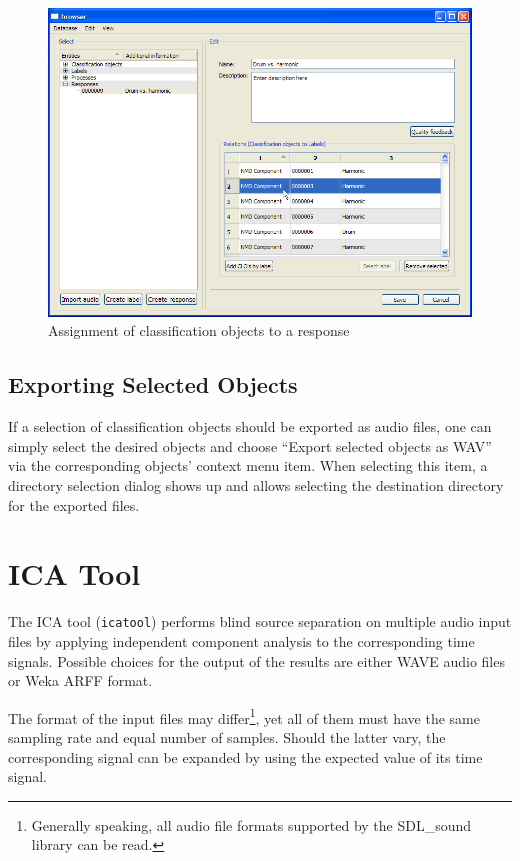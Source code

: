 \begin{figure}
    \includegraphics[width=\textwidth]{images/COAssignment.png}
    \caption{%
        \label{figure:COAssignment}%
        Assignment of classification objects to a response
    }
\end{figure}


\subsection{Exporting Selected Objects}

If a selection of classification objects should be exported as audio files, one
can simply select the desired objects and choose ``Export selected objects as WAV''
via the corresponding objects' context menu item. When selecting this item, a
directory selection dialog shows up and allows selecting the destination
directory for the exported files.


\section{ICA Tool}

The ICA tool (\verb!icatool!) performs blind source separation on multiple audio
input files by applying independent component analysis to the corresponding time
signals. Possible choices for the output of the results are either WAVE audio
files or Weka ARFF format.

The format of the input files may differ\footnote{Generally speaking, all audio
  file formats supported by the SDL\_sound library can be read.}, yet all of them
must have the same sampling rate and equal number of samples. Should the latter
vary, the corresponding signal can be expanded by using the expected value of
its time signal.

